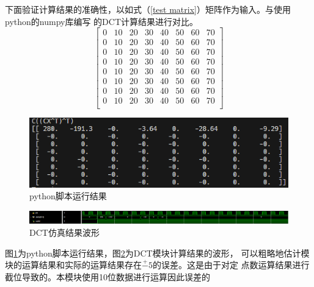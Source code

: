 \documentclass{article}
\numberwithin {equation}{section}
\begin{document}
\begin{spacing}{1.25}
        下面验证计算结果的准确性，以如式（\ref{test matrix}）矩阵作为输入。与使用python的numpy库编写
        的DCT计算结果进行对比。
        \begin{equation}
        \begin{bmatrix}
            0 & 10 & 20 & 30 & 40 & 50 & 60 & 70\\ 
            0 & 10 & 20 & 30 & 40 & 50 & 60 & 70\\ 
            0 & 10 & 20 & 30 & 40 & 50 & 60 & 70\\ 
            0 & 10 & 20 & 30 & 40 & 50 & 60 & 70\\ 
            0 & 10 & 20 & 30 & 40 & 50 & 60 & 70\\ 
            0 & 10 & 20 & 30 & 40 & 50 & 60 & 70\\ 
            0 & 10 & 20 & 30 & 40 & 50 & 60 & 70\\ 
            0 & 10 & 20 & 30 & 40 & 50 & 60 & 70\\ 
        \end{bmatrix} 
        \label{test matrix}
        \end{equation}

        \begin{figure}[H]
          \centering
          \includegraphics[scale=0.8]{./pictures/python脚本运行结果.png}
          \caption{python脚本运行结果}
          \label{py result}
        \end{figure}
        \begin{figure}[H]
          \centering
          \includegraphics[scale=0.3725]{./pictures/DCTSimulationResult.png}
          \caption{ DCT仿真结果波形}
          \label{result simulation}
        \end{figure}

        图\ref{py result}为python脚本运行结果，图\ref{result simulation}为DCT模块计算结果的波形，
        可以粗略地估计模块的运算结果和实际的运算结果存在$\stackrel{+}{-}5$的误差。这是由于对定
        点数运算结果进行截位导致的。本模块使用10位数据进行运算因此误差的

\end{spacing}
\end{document}
